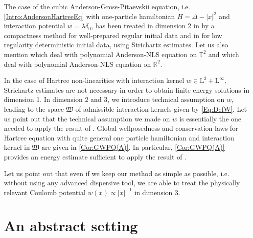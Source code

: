 \documentclass{article}
\def\R{\mathbb R}
\def\T{\mathbb T}
\def\L{\mathrm L}
\theoremstyle{definition}
\numberwithin{equation}{section}
\begin{document}
The case of the cubic Anderson-Gross-Pitaevskii equation, i.e. \cref{Intro:AndersonHartreeEq} with one-particle hamiltonian $H=\Delta-|x|^2$ and interaction potential $w=\lambda\delta_0$, has been treated in dimension 2 in \cite{Mackowiak_2025} by a compactness method for well-prepared regular initial data and in \cite{MackowiakStrichartzConfAnderson} for low regularity deterministic initial data, using Strichartz estimates. Let us also mention \cite{debussche_weber_T2,tzvetkov2020dimensional,Tzvetkov_2023} which deal with polynomial Anderson-NLS equation on $\T^2$ and \cite{debussche2017solution,debussche2023global} which deal with polynomial Anderson-NLS equation on $\R^2$.

In the case of Hartree non-linearities with interaction kernel $w\in\L^2+\L^\infty$, Strichartz estimates are not necessary in order to obtain finite energy solutions in dimension 1. In dimension 2 and 3, we introduce technical assumption on $w$, leading to the space $\mathfrak{W}$ of admissible interaction kernels given by \cref{Eq:DefW}. Let us point out that the technical assumption we made on $w$ is essentially the one needed to apply the result of \cite{PicklKnowles}. Global wellposedness and conservation laws for Hartree equation with quite general one particle hamiltonian and interaction kernel in $\mathfrak{W}$ are given in \cref{Cor:GWPQ(A)}. In particular, \cref{Cor:GWPQ(A)} provides an energy estimate sufficient to apply the result of \cite{PicklKnowles}.

Let us point out that even if we keep our method as simple as possible, i.e. without using any advanced dispersive tool, we are able to treat the physically relevant Coulomb potential $w(x)\propto |x|^{-1}$ in dimension 3. 


\section{An abstract setting}
\end{document}

